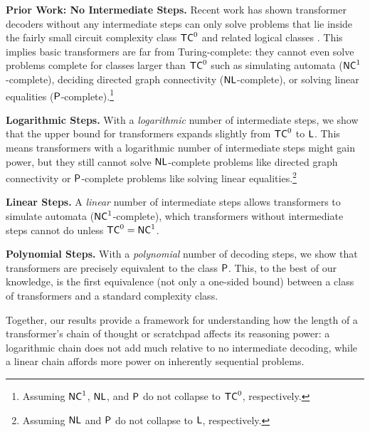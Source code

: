 \documentclass{article}
\begin{document}
\noindent \textbf{Prior Work: No Intermediate Steps.}
Recent work has shown transformer decoders without any intermediate steps can only solve problems that lie inside the fairly small circuit complexity class $\TC^0$ \citep{merrill2023parallelism} and related logical classes \citep{merrill2023logic,chiang2023tighter}. This implies basic transformers are far from Turing-complete: they cannot even solve problems complete for classes larger than $\TC^0$ such as simulating automata ($\NC^1$-complete), deciding directed graph connectivity ($\NL$-complete), or solving linear equalities ($\P$-complete).\footnote{Assuming $\NC^1$, $\NL$, and $\P$ do not collapse to $\TC^0$, respectively.}

\noindent \textbf{Logarithmic Steps.}
With a \emph{logarithmic} number of intermediate steps, we show that the upper bound for transformers expands slightly from $\TC^0$ to $\L$. This means transformers with a logarithmic number of intermediate steps might gain power, but they still cannot solve $\NL$-complete problems like directed graph connectivity or $\P$-complete problems like solving linear equalities.\footnote{\label{footnote:no-collapse-to-L} Assuming $\NL$ and $\P$ do not collapse to $\L$, respectively.}

\noindent \textbf{Linear Steps.}
A \emph{linear} number of intermediate steps allows transformers to simulate automata ($\NC^1$-complete),
which transformers without intermediate steps cannot do unless $\TC^0 = \NC^1$.

\noindent \textbf{Polynomial Steps.}
With a \emph{polynomial} number of decoding steps, we show that transformers are precisely equivalent to the class $\P$. This, to the best of our knowledge, is the first equivalence (not only a one-sided bound) between a class of transformers and a standard complexity class.

Together, our results provide a framework for understanding how the length of a transformer's chain of thought or scratchpad affects its reasoning power: a logarithmic chain does not add much relative to no intermediate decoding, while a linear chain affords more power on inherently sequential problems. 
\end{document}

